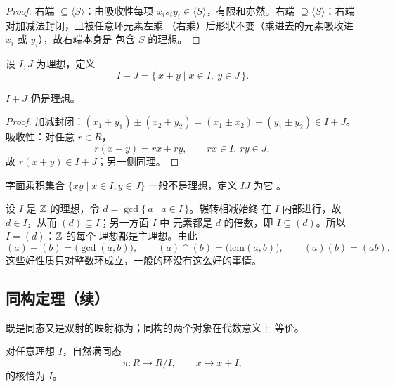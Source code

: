 \begin{proof}
右端 $\subseteq \langle S\rangle$：由吸收性每项
$x_i s_i y_i\in\langle S\rangle$，有限和亦然。右端
$\supseteq \langle S\rangle$：右端对加减法封闭，且被任意环元素左乘
（右乘）后形状不变（乘进去的元素吸收进 $x_i$ 或 $y_i$），故右端本身是
包含 $S$ 的理想。
\end{proof}

\begin{definition}[理想的和]
设 $I, J$ 为理想，定义
\[
  I + J = \{\,x + y \mid x\in I,\ y\in J\,\}.
\]
\end{definition}

\begin{proposition}
$I + J$ 仍是理想。
\end{proposition}

\begin{proof}
加减封闭：$(x_1 + y_1)\pm(x_2 + y_2) = (x_1\pm x_2) + (y_1\pm y_2)\in I+J$。
吸收性：对任意 $r\in R$，
\[
  r(x+y) = rx + ry, \qquad rx\in I,\ ry\in J,
\]
故 $r(x+y)\in I+J$；另一侧同理。
\end{proof}

\begin{definition}[理想的积]
字面乘积集合 $\{xy \mid x\in I, y\in J\}$ 一般不是理想，定义 $IJ$ 为它
。
\end{definition}

\begin{example}[$\Z$ 的理想都是主理想]
设 $I$ 是 $\Z$ 的理想，令 $d = \gcd\{\,a \mid a\in I\,\}$。辗转相减始终
在 $I$ 内部进行，故 $d\in I$，从而 $(d)\subseteq I$；另一方面 $I$ 中
元素都是 $d$ 的倍数，即 $I\subseteq(d)$。所以 $I = (d)$：$\Z$ 的每个
理想都是主理想。由此
\[
  (a) + (b) = \big(\gcd(a,b)\big), \qquad
  (a)\cap(b) = \big(\mathrm{lcm}(a,b)\big), \qquad
  (a)(b) = (ab).
\]
这些好性质只对整数环成立，一般的环没有这么好的事情。
\end{example}

\subsection{同构定理（续）}

\begin{definition}[同构]
既是同态又是双射的映射称为；同构的两个对象在代数意义上
等价。
\end{definition}

对任意理想 $I$，自然满同态
\[
  \pi\colon R\longrightarrow R/I, \qquad x\mapsto x + I,
\]
的核恰为 $I$。

